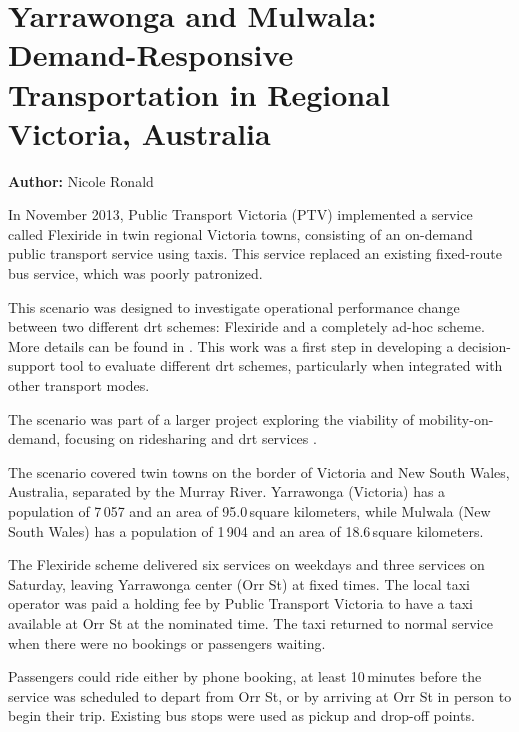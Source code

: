 \section{Yarrawonga and Mulwala: Demand-Responsive Transportation in Regional Victoria, Australia}
\label{sec:yarrawonga}
\hfill \textbf{Author:} Nicole Ronald


In November 2013, Public Transport Victoria (PTV) implemented a service called
Flexiride in twin regional Victoria towns, consisting of an on-demand public
transport service using taxis. This service replaced an existing fixed-route bus
service, which was poorly patronized.

This scenario was designed to investigate operational performance change  
 between two different \gls{drt} schemes: Flexiride and a
completely ad-hoc scheme. More details can be found in
\citep[][]{RonThoWin2015}. This work was a first step in developing a
decision-support tool to evaluate different \gls{drt} schemes, particularly when
integrated with other transport modes. 

The scenario was part of a larger project exploring the viability of
mobility-on-demand, focusing on ridesharing and \gls{drt} services \citep[][]{Ronald_iMoD_2014}.

The scenario covered twin towns on the border of Victoria and New South Wales,
Australia, separated by the Murray River. Yarrawonga (Victoria) has a population
of 7\,057 and an area of 95.0\,square kilometers, while Mulwala (New South Wales) has a
population of 1\,904 and an area of 18.6\,square kilometers. 

The Flexiride scheme delivered six services on weekdays and three services on
Saturday, leaving Yarrawonga center (Orr St) at fixed times. The local
taxi operator was paid a holding fee by Public Transport Victoria to have a taxi available at
Orr St at the nominated time. The taxi returned to normal service when there were no
bookings or passengers waiting.

Passengers could ride either by phone booking, at least 10\,minutes before
the service was scheduled to depart from Orr St, or by arriving at Orr St in
person to begin their trip. Existing bus stops were used as pickup and drop-off
points.

